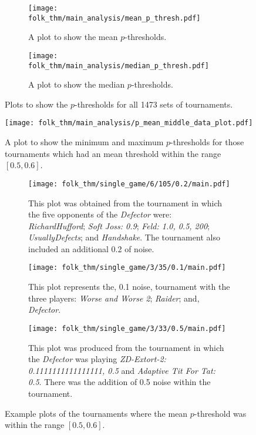 \begin{figure}
    \begin{subfigure}{.45\textwidth}
        \centering
        \texttt{[image: folk\_thm/main\_analysis/mean\_p\_thresh.pdf]}
        \caption{A plot to show the mean \(p\)-thresholds.}\label{subfig:mean_p_thresh}
    \end{subfigure}
    \begin{subfigure}{.45\textwidth}
        \centering
        \texttt{[image: folk\_thm/main\_analysis/median\_p\_thresh.pdf]}
        \caption{A plot to show the median \(p\)-thresholds.}\label{subfig:median_p_thresh}
    \end{subfigure}
    \caption{Plots to show the \(p\)-thresholds for all 1473 sets of tournaments.}\label{fig:mean_median_p_thresh}
\end{figure}


\begin{figure}
    \centering
    \texttt{[image: folk\_thm/main\_analysis/p\_mean\_middle\_data\_plot.pdf]}
    \caption{A plot to show the minimum and maximum \(p\)-thresholds for those tournaments which had an mean threshold within the range \([0.5, 0.6]\).}\label{fig:fig:p_mean_middle_plot}
\end{figure}


\begin{figure}
    \begin{subfigure}{0.3\textwidth}
        \centering
        \texttt{[image: folk\_thm/single\_game/6/105/0.2/main.pdf]}
        \caption{This plot was obtained from the tournament in which the five
        opponents of the \textit{Defector} were: \textit{RichardHufford};
        \textit{Soft Joss: 0.9}; \textit{Feld: 1.0, 0.5, 200};
        \textit{UsuallyDefects}; and \textit{Handshake}. The tournament also included an additional 0.2 of noise.}
    \end{subfigure}

    \begin{subfigure}{0.3\textwidth}
        \centering
        \texttt{[image: folk\_thm/single\_game/3/35/0.1/main.pdf]}
        \caption{This plot represents the, 0.1 noise, tournament with the three players: \textit{Worse and Worse 2}; \textit{Raider}; and, \textit{Defector}.}
    \end{subfigure}

    \begin{subfigure}{0.3\textwidth}
        \centering
        \texttt{[image: folk\_thm/single\_game/3/33/0.5/main.pdf]}
        \caption{This plot was produced from the tournament in which the \textit{Defector} was playing \textit{ZD-Extort-2: 0.1111111111111111, 0.5} and \textit{Adaptive Tit For Tat: 0.5}. There was the addition of 0.5 noise within the tournament.}
    \end{subfigure}
    \caption{Example plots of the tournaments where the mean \(p\)-threshold was within the range \([0.5, 0.6]\).}\label{fig:mean_middle_specific}
\end{figure}


